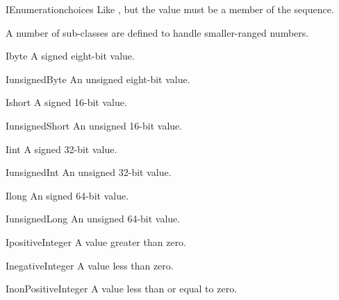 \begin{classdesc}{IEnumeration}{choices}
Like , but the value must be a member of
the  sequence.
\end{classdesc}

A number of sub-classes are defined to handle smaller-ranged numbers.

\begin{classdesc}{Ibyte}{}
A signed eight-bit value.
\end{classdesc}

\begin{classdesc}{IunsignedByte}{}
An unsigned eight-bit value.
\end{classdesc}

\begin{classdesc}{Ishort}{}
A signed 16-bit value.
\end{classdesc}

\begin{classdesc}{IunsignedShort}{}
An unsigned 16-bit value.
\end{classdesc}

\begin{classdesc}{Iint}{}
A signed 32-bit value.
\end{classdesc}

\begin{classdesc}{IunsignedInt}{}
An unsigned 32-bit value.
\end{classdesc}

\begin{classdesc}{Ilong}{}
An signed 64-bit value.
\end{classdesc}

\begin{classdesc}{IunsignedLong}{}
An unsigned 64-bit value.
\end{classdesc}

\begin{classdesc}{IpositiveInteger}{}
A value greater than zero.
\end{classdesc}

\begin{classdesc}{InegativeInteger}{}
A value less than zero.
\end{classdesc}

\begin{classdesc}{InonPositiveInteger}{}
A value less than or equal to zero.
\end{classdesc}

